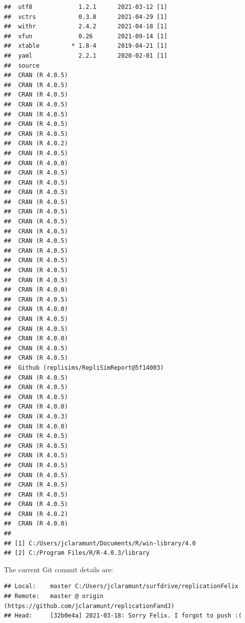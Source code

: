 \documentclass[10,a4paperpaper,]{article}
\begin{document}
\begin{verbatim}
##  utf8             1.2.1      2021-03-12 [1]
##  vctrs            0.3.8      2021-04-29 [1]
##  withr            2.4.2      2021-04-18 [1]
##  xfun             0.26       2021-09-14 [1]
##  xtable         * 1.8-4      2019-04-21 [1]
##  yaml             2.2.1      2020-02-01 [1]
##  source                                   
##  CRAN (R 4.0.5)                           
##  CRAN (R 4.0.5)                           
##  CRAN (R 4.0.5)                           
##  CRAN (R 4.0.5)                           
##  CRAN (R 4.0.5)                           
##  CRAN (R 4.0.5)                           
##  CRAN (R 4.0.5)                           
##  CRAN (R 4.0.2)                           
##  CRAN (R 4.0.5)                           
##  CRAN (R 4.0.0)                           
##  CRAN (R 4.0.5)                           
##  CRAN (R 4.0.5)                           
##  CRAN (R 4.0.5)                           
##  CRAN (R 4.0.5)                           
##  CRAN (R 4.0.5)                           
##  CRAN (R 4.0.5)                           
##  CRAN (R 4.0.5)                           
##  CRAN (R 4.0.5)                           
##  CRAN (R 4.0.5)                           
##  CRAN (R 4.0.5)                           
##  CRAN (R 4.0.5)                           
##  CRAN (R 4.0.5)                           
##  CRAN (R 4.0.0)                           
##  CRAN (R 4.0.5)                           
##  CRAN (R 4.0.0)                           
##  CRAN (R 4.0.5)                           
##  CRAN (R 4.0.5)                           
##  CRAN (R 4.0.0)                           
##  CRAN (R 4.0.5)                           
##  CRAN (R 4.0.5)                           
##  Github (replisims/RepliSimReport@5f14003)
##  CRAN (R 4.0.5)                           
##  CRAN (R 4.0.5)                           
##  CRAN (R 4.0.5)                           
##  CRAN (R 4.0.0)                           
##  CRAN (R 4.0.3)                           
##  CRAN (R 4.0.0)                           
##  CRAN (R 4.0.5)                           
##  CRAN (R 4.0.5)                           
##  CRAN (R 4.0.5)                           
##  CRAN (R 4.0.5)                           
##  CRAN (R 4.0.5)                           
##  CRAN (R 4.0.5)                           
##  CRAN (R 4.0.5)                           
##  CRAN (R 4.0.5)                           
##  CRAN (R 4.0.2)                           
##  CRAN (R 4.0.0)                           
## 
## [1] C:/Users/jclaramunt/Documents/R/win-library/4.0
## [2] C:/Program Files/R/R-4.0.3/library
\end{verbatim}

The current Git commit details are:

\begin{verbatim}
## Local:    master C:/Users/jclaramunt/surfdrive/replicationFelix
## Remote:   master @ origin (https://github.com/jclaramunt/replicationFandJ)
## Head:     [32b0e4a] 2021-03-18: Sorry Felix. I forgot to push :(
\end{verbatim}
\end{document}
